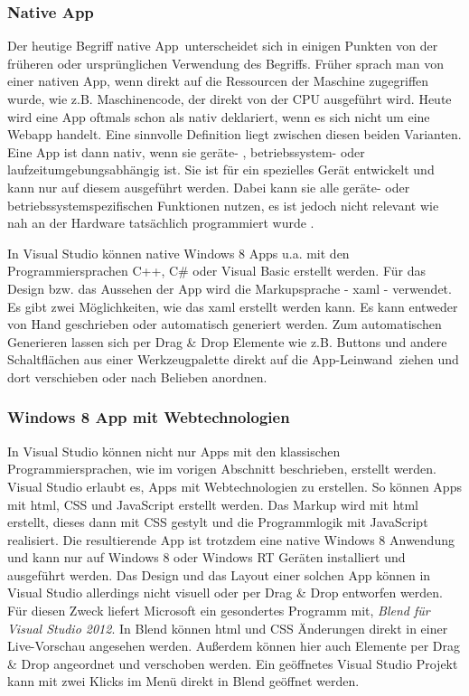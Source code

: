 \documentclass[12pt,a4paper,bibtotoc,abstracton]{scrartcl}
\begin{document}
\subsubsection{Native App}
\label{subsubsec:nativ}
Der heutige Begriff \glqq native App\grqq\ unterscheidet sich in einigen Punkten von der früheren oder ursprünglichen Verwendung des Begriffs. Früher sprach man von einer nativen App, wenn direkt auf die Ressourcen der  Maschine zugegriffen wurde, wie z.B. Maschinencode, der direkt von der CPU ausgeführt wird. Heute wird eine App oftmals schon als nativ deklariert, wenn es sich nicht um eine Webapp handelt. Eine sinnvolle Definition liegt zwischen diesen beiden Varianten. Eine App ist dann nativ, wenn sie geräte- , betriebssystem- oder laufzeitumgebungsabhängig ist. Sie ist für ein spezielles Gerät entwickelt und kann nur auf diesem ausgeführt werden. Dabei kann sie alle geräte- oder betriebssystemspezifischen Funktionen nutzen, es ist jedoch nicht relevant wie nah an der Hardware tatsächlich programmiert wurde \citep{OBrian2013}.

In Visual Studio können native Windows 8  Apps u.a. mit den Programmiersprachen C++, C\# oder Visual Basic erstellt werden. Für das Design bzw. das Aussehen der App wird die Markupsprache - \ac{xaml} - verwendet. Es gibt zwei Möglichkeiten, wie das \ac{xaml} erstellt werden kann. Es kann entweder von Hand geschrieben oder automatisch generiert werden. Zum automatischen Generieren lassen sich per Drag \& Drop Elemente wie z.B. Buttons und andere Schaltflächen aus einer Werkzeugpalette direkt auf die \glqq App-Leinwand\grqq\ ziehen und dort verschieben oder nach Belieben anordnen.

\subsubsection{Windows 8 App mit Webtechnologien}
\label{subsubsec:webwin8}
In Visual Studio können nicht nur Apps mit den klassischen Programmiersprachen, wie im vorigen Abschnitt beschrieben, erstellt werden. Visual Studio erlaubt es, Apps mit Webtechnologien zu erstellen. So können Apps mit \ac{html}, CSS und JavaScript erstellt werden. Das Markup wird mit \ac{html} erstellt, dieses dann mit CSS gestylt und die Programmlogik mit JavaScript realisiert. Die resultierende App ist trotzdem eine native Windows 8 Anwendung und kann nur auf Windows 8 oder Windows RT Geräten installiert und ausgeführt werden. Das Design und das Layout einer solchen App können in Visual Studio allerdings nicht visuell oder per Drag \& Drop entworfen werden. Für diesen Zweck liefert Microsoft ein gesondertes Programm mit, \textit{Blend für Visual Studio 2012}. In Blend können \ac{html} und CSS Änderungen direkt in einer Live-Vorschau angesehen werden. Außerdem können hier auch Elemente per Drag \& Drop angeordnet und verschoben werden. Ein geöffnetes Visual Studio Projekt kann mit zwei Klicks im Menü direkt in Blend geöffnet werden. 
\end{document}

